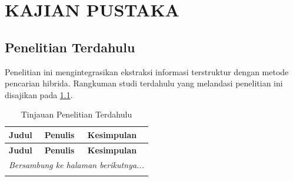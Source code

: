 \chapter{KAJIAN PUSTAKA}

\section{Penelitian Terdahulu}

Penelitian ini mengintegrasikan ekstraksi informasi terstruktur dengan metode pencarian hibrida. Rangkuman studi terdahulu yang melandasi penelitian ini disajikan pada \ref{tab:penelitian_terdahulu_revisi}.

\renewcommand{\arraystretch}{1.3}
\begin{longtable}{|p{4cm}|p{2cm}|p{10cm}|}
    \caption{Tinjauan Penelitian Terdahulu} \label{tab:penelitian_terdahulu_revisi}                                                                                          \\

    \hline
    \textbf{Judul}                                                                                                                  & \textbf{Penulis} & \textbf{Kesimpulan} \\ \hline
    \endfirsthead

    \hline
    \textbf{Judul}                                                                                                                  & \textbf{Penulis} & \textbf{Kesimpulan} \\ \hline
    \endhead

    \hline
    \multicolumn{3}{r}{\textit{Bersambung ke halaman berikutnya...}}                                                                                                         \\
    \endfoot

    \hline
    \endlastfoot


\end{longtable}
